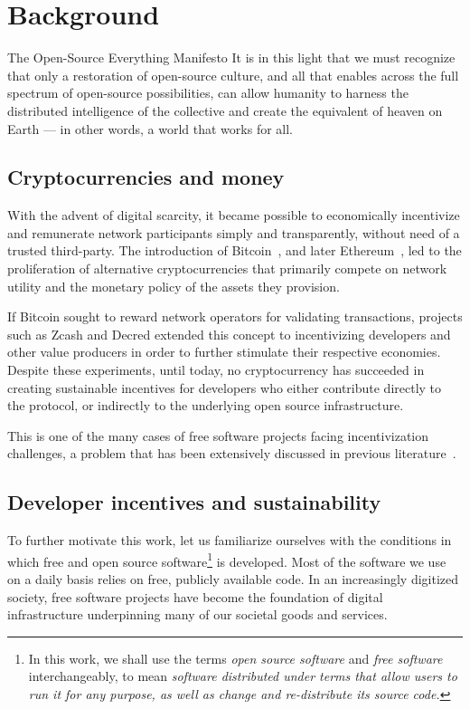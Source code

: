 \section{Background}

\begin{epigraph}{The Open-Source Everything Manifesto}
    \noindent It is in this light that we must recognize that only a restoration of
    open-source culture, and all that enables across the full spectrum of
    open-source possibilities, can allow humanity to harness the distributed
    intelligence of the collective and create the equivalent of heaven on Earth
    --- in other words, a world that works for all.
\end{epigraph}

\subsection{Cryptocurrencies and money}

With the advent of digital scarcity, it became possible to economically
incentivize and remunerate network participants simply and transparently,
without need of a trusted third-party. The introduction of
Bitcoin~\cite{bitcoin}, and later Ethereum~\cite{ethereum}, led to the
proliferation of alternative cryptocurrencies that primarily compete on
network utility and the monetary policy of the assets they provision.

If Bitcoin sought to reward network operators for validating transactions,
projects such as Zcash and Decred extended this concept to incentivizing
developers and other value producers in order to further stimulate their
respective economies. Despite these experiments, until today, no cryptocurrency
has succeeded in creating sustainable incentives for developers who either
contribute directly to the protocol, or indirectly to the underlying open
source infrastructure.

This is one of the many cases of free software projects facing incentivization
challenges, a problem that has been extensively discussed in previous
literature~\cite{roads and bridges}.

\subsection{Developer incentives and sustainability}
\label{s:incentives}

To further motivate this work, let us familiarize ourselves with the
conditions in which free and open source software\footnote{In this work, we
shall use the terms \emph{open source software} and \emph{free software} interchangeably,
to mean \emph{software distributed under terms that allow users to run it
for any purpose, as well as change and re-distribute its source code.}}
is developed. Most of the software we use on a daily basis relies on free,
publicly available code. In an increasingly digitized society, free software
projects have become the foundation of digital infrastructure underpinning many
of our societal goods and services.

